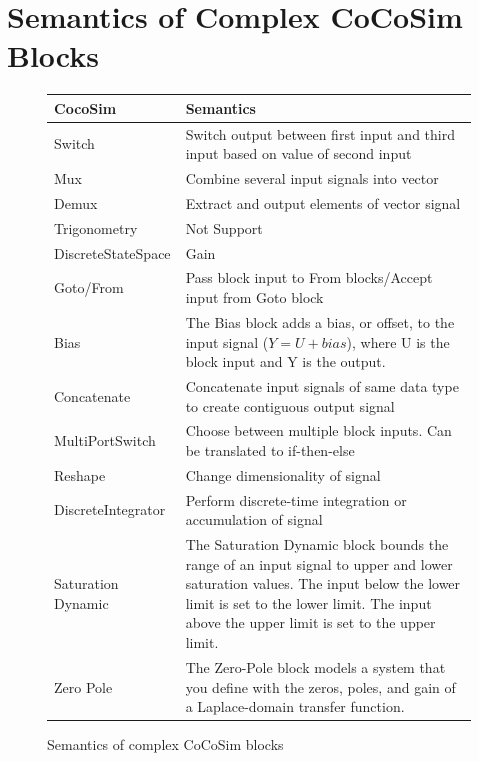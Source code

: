 \documentclass{article}
\begin{document}
\section{Semantics of Complex CoCoSim Blocks}

\begin{figure}[t]
\centering
{
\begin{tabular}{lp{5cm}}
\hline
\textbf{CocoSim} & \textbf{Semantics}  \\
\hline
Switch &
{Switch output between first input and third input based on value of second input}

\\
Mux &
Combine several input signals into vector
\\


Demux &
Extract and output elements of vector signal
\\

Trigonometry &
Not Support
\\

DiscreteStateSpace &
Gain
\\

Goto/From &
Pass block input to From blocks/Accept input from Goto block
\\

Bias &
The Bias block adds a bias, or offset, to the input signal ($Y = U + bias$), where U is the block input and Y is the output.
\\

Concatenate &
Concatenate input signals of same data type to create contiguous output signal
\\

MultiPortSwitch &
Choose between multiple block inputs. Can be translated to if-then-else
\\

Reshape &
Change dimensionality of signal
\\

DiscreteIntegrator &
Perform discrete-time integration or accumulation of signal
\\

Saturation Dynamic &
The Saturation Dynamic block bounds the range of an input signal to upper and lower saturation values. The input below the lower limit is set to the lower limit. The input above the upper limit is set to the upper limit.
\\

Zero Pole &
The Zero-Pole block models a system that you define with the zeros, poles, and gain of a Laplace-domain transfer function. 
\\

\hline
\end{tabular}
}
\caption{Semantics of complex CoCoSim blocks}
\label{mapping2}
\end{figure}
\end{document}
